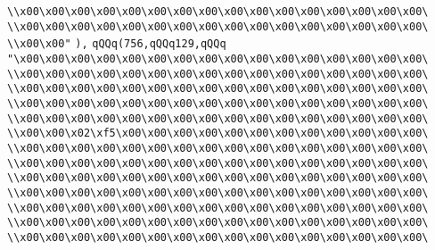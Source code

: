 \verb|\\x00\x00\x00\x00\x00\x00\x00\x00\x00\x00\x00\x00\x00\x00\x00\x00\|\newline
\verb|\\x00\x00\x00\x00\x00\x00\x00\x00\x00\x00\x00\x00\x00\x00\x00\x00\|\newline
\verb|\\x00\x00"|\newline
\verb|),|\newline
\verb|qQQq(756,qQQq129,qQQq|\newline
\verb|"\x00\x00\x00\x00\x00\x00\x00\x00\x00\x00\x00\x00\x00\x00\x00\x00\|\newline
\verb|\\x00\x00\x00\x00\x00\x00\x00\x00\x00\x00\x00\x00\x00\x00\x00\x00\|\newline
\verb|\\x00\x00\x00\x00\x00\x00\x00\x00\x00\x00\x00\x00\x00\x00\x00\x00\|\newline
\verb|\\x00\x00\x00\x00\x00\x00\x00\x00\x00\x00\x00\x00\x00\x00\x00\x00\|\newline
\verb|\\x00\x00\x00\x00\x00\x00\x00\x00\x00\x00\x00\x00\x00\x00\x00\x00\|\newline
\verb|\\x00\x00\x02\xf5\x00\x00\x00\x00\x00\x00\x00\x00\x00\x00\x00\x00\|\newline
\verb|\\x00\x00\x00\x00\x00\x00\x00\x00\x00\x00\x00\x00\x00\x00\x00\x00\|\newline
\verb|\\x00\x00\x00\x00\x00\x00\x00\x00\x00\x00\x00\x00\x00\x00\x00\x00\|\newline
\verb|\\x00\x00\x00\x00\x00\x00\x00\x00\x00\x00\x00\x00\x00\x00\x00\x00\|\newline
\verb|\\x00\x00\x00\x00\x00\x00\x00\x00\x00\x00\x00\x00\x00\x00\x00\x00\|\newline
\verb|\\x00\x00\x00\x00\x00\x00\x00\x00\x00\x00\x00\x00\x00\x00\x00\x00\|\newline
\verb|\\x00\x00\x00\x00\x00\x00\x00\x00\x00\x00\x00\x00\x00\x00\x00\x00\|\newline
\verb|\\x00\x00\x00\x00\x00\x00\x00\x00\x00\x00\x00\x00\x00\x00\x00\x00\|\newline
